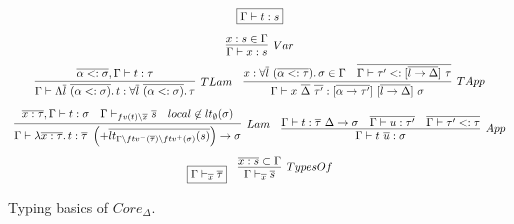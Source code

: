 \documentclass[11pt]{article}
\newcommand{\mathframebox}[1]{\framebox{$\displaystyle #1$}}
\newcommand{\ap}{~}
\begin{document}
    \begin{figure}
        \begin{gather*}
            \mathframebox{\Gamma\vdash t : s} \\[0.5em]
            \infer[Var]{\Gamma\vdash x : s}{x : s \in \Gamma} \\
            \begin{array}{cc}
                \infer[TLam]{
                    \Gamma\vdash\Lambda\overline{l}\ap\overline{(\alpha <: \sigma)}\ldotp t : \forall\overline{l}\ap\overline{(\alpha <: \sigma)}\ldotp\tau
                }{
                    \overline{\alpha <: \sigma}, \Gamma\vdash t : \tau
                } &
                \infer[TApp]{
                    \Gamma\vdash x\ap\overline{\Delta}\ap\overline{\tau'} : [\overline{\alpha\to\tau'}]\ap[\overline{l\to\Delta}]\ap\sigma
                }{
                    x : \forall\overline{l}\ap(\overline{\alpha <: \tau})\ldotp \sigma \in \Gamma
                    &
                    \overline{\Gamma\vdash\tau' <: [\overline{l\to\Delta}]\ap\tau}
                }
            \end{array} \\[0.5em]
            \begin{array}{cc}
                \infer[Lam]{
                    \Gamma\vdash \lambda \overline{x : \tau} \ldotp t :  \overline{\tau}~ \left(+\overline{lt_{\Gamma\setminus ftv^-(\overline{\tau}) \setminus ftv^+(\sigma)}(s)}\right) \to \sigma
                }{
                    \overline{x : \tau}, \Gamma\vdash t : \sigma
                    &
                    \Gamma\vdash_{fv(t)\setminus \overline{x}}\overline{s}
                    &
                    local \not\in lt_\emptyset(\sigma)
                } &
                \infer[App]{
                    \Gamma\vdash t \ap \overline{u} : \sigma
                } {
                    \Gamma\vdash t : \overline{\tau}~\Delta\to\sigma
                    &
                    \overline{\Gamma\vdash u : \tau'}
                    &
                    \overline{\Gamma\vdash\tau' <: \tau}
                }
            \end{array} \\[0.5em]
            \begin{array}{cc}
                \mathframebox{\Gamma\vdash_{\overline{x}}\overline{\tau}} &
                \infer[TypesOf]{\Gamma\vdash_{\overline{x}}\overline{s}}{\overline{x : s} \subset \Gamma}
            \end{array}
        \end{gather*}
        \caption{Typing basics of $Core_\Delta$.}
        \label{fig:core-functions}
    \end{figure}
\end{document}
